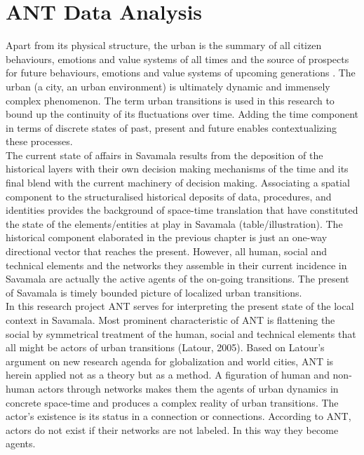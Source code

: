 \documentclass[11pt]{report}
\begin{document}


\chapter{ANT Data Analysis}

Apart from its physical structure, the urban is the summary of all citizen behaviours, emotions and value systems of all times and the source of prospects for future behaviours, emotions and value systems of upcoming generations \cite{Stojkov grad kultura politika}.
The urban (a city, an urban environment) is ultimately dynamic and immensely complex phenomenon. The term urban transitions is used in this research to bound up the continuity of its fluctuations over time.
Adding the time component in terms of discrete states of past, present and future enables contextualizing these processes. 
\\
The current state of affairs in Savamala results from the deposition of the historical layers with their own decision making mechanisms of the time and its final blend with the current machinery of decision making.
Associating a spatial component to the structuralised historical deposits of data, procedures, and identities provides the background of space-time translation that have constituted the state of the elements/entities at play in Savamala (table/illustration).
The historical component elaborated in the previous chapter is just an one-way directional vector that reaches the present.
However, all human, social and technical elements and the networks they assemble in their current incidence in Savamala are actually the active agents of the on-going transitions. The present of Savamala is timely bounded picture of localized urban transitions. 
\\
In this research project ANT serves for interpreting the present state of the local context in Savamala.
Most prominent characteristic of ANT is flattening the social by symmetrical treatment of the human, social and technical elements that all might be actors of urban transitions (Latour, 2005). 
Based on Latour’s argument on new research agenda for globalization and world cities, ANT is herein applied not as a theory but as a method. A figuration of human and non-human actors through networks makes them the agents of urban dynamics in concrete space-time and produces a complex reality of urban transitions. 
The actor’s existence is its status in a connection or connections. According to ANT, actors do not exist if their networks are not labeled. In this way they become agents.
\end{document}
